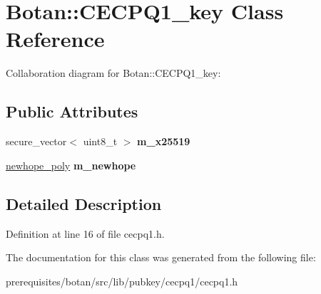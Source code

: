 \hypertarget{class_botan_1_1_c_e_c_p_q1__key}{}\section{Botan\+:\+:C\+E\+C\+P\+Q1\+\_\+key Class Reference}
\label{class_botan_1_1_c_e_c_p_q1__key}


Collaboration diagram for Botan\+:\+:C\+E\+C\+P\+Q1\+\_\+key\+:
\subsection*{Public Attributes}
\begin{DoxyCompactItemize}
\item 
\mbox{\label{class_botan_1_1_c_e_c_p_q1__key_aac00b84d096dbad58ffd418a894f6117}} 
secure\+\_\+vector$<$ uint8\+\_\+t $>$ {\bfseries m\+\_\+x25519}
\item 
\mbox{\label{class_botan_1_1_c_e_c_p_q1__key_ab14450eae8238368bdd1388fd1e0e867}} 
\mbox{\hyperlink{class_botan_1_1newhope__poly}{newhope\+\_\+poly}} {\bfseries m\+\_\+newhope}
\end{DoxyCompactItemize}


\subsection{Detailed Description}


Definition at line 16 of file cecpq1.\+h.



The documentation for this class was generated from the following file\+:\begin{DoxyCompactItemize}
\item 
prerequisites/botan/src/lib/pubkey/cecpq1/cecpq1.\+h\end{DoxyCompactItemize}
